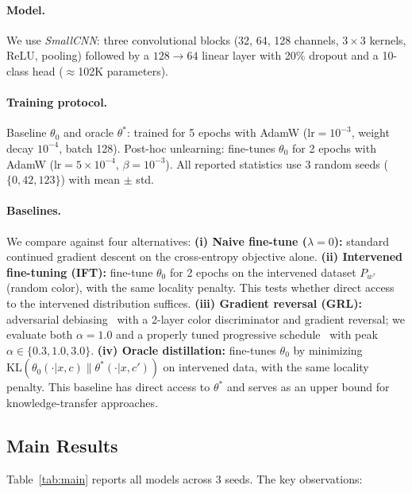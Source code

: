 \documentclass{article}
\newcommand{\Pwt}{P_{w^\tau}}
\begin{document}
\paragraph{Model.}
We use \textit{SmallCNN}: three convolutional blocks (32, 64, 128 channels,
$3\times3$ kernels, ReLU, pooling) followed by a $128\to64$ linear layer
with 20\% dropout and a 10-class head ($\approx$102K parameters).

\paragraph{Training protocol.}
Baseline $\theta_0$ and oracle $\theta^*$: trained for 5 epochs with AdamW
($\mathrm{lr}{=}10^{-3}$, weight decay $10^{-4}$, batch 128).  Post-hoc
unlearning: fine-tunes $\theta_0$ for 2 epochs with AdamW
($\mathrm{lr}{=}5\times10^{-4}$, $\beta{=}10^{-3}$).  All reported statistics
use 3 random seeds ($\{0, 42, 123\}$) with mean $\pm$ std.

\paragraph{Baselines.}
We compare against four alternatives:
\textbf{(i) Naive fine-tune ($\lambda{=}0$):} standard continued gradient
descent on the cross-entropy objective alone.
\textbf{(ii) Intervened fine-tuning (IFT):} fine-tune $\theta_0$ for 2 epochs
on the intervened dataset $\Pwt$ (random color), with the same locality penalty.
This tests whether direct access to the intervened distribution suffices.
\textbf{(iii) Gradient reversal (GRL):} adversarial debiasing~\cite{ganin2016domain}
with a 2-layer color discriminator and gradient reversal; we evaluate both
$\alpha{=}1.0$ and a properly tuned progressive schedule~\cite{ganin2016domain}
with peak $\alpha \in \{0.3, 1.0, 3.0\}$.
\textbf{(iv) Oracle distillation:} fine-tunes $\theta_0$ by minimizing
$\mathrm{KL}(\theta_0(\cdot|x,c) \| \theta^*(\cdot|x,c'))$ on intervened data,
with the same locality penalty.  This baseline has direct access to $\theta^*$
and serves as an upper bound for knowledge-transfer approaches.

\subsection{Main Results}

Table~\ref{tab:main} reports all models across 3 seeds.  The key observations:
\end{document}
